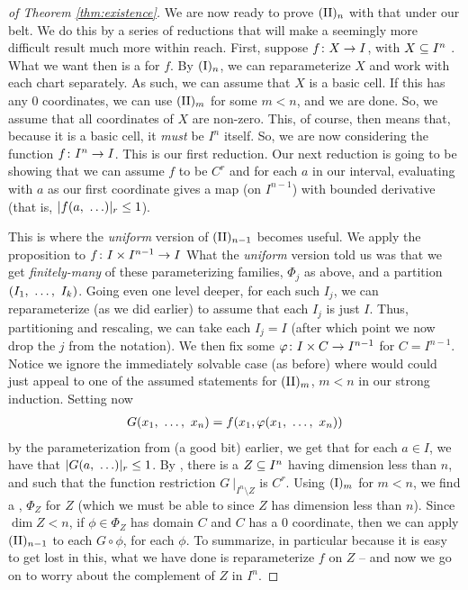\begin{proof}[of Theorem \ref{thm:existence}]
    We are now ready to prove $\IIn[n]$ with that under our belt. We do this by a series of reductions that will make a seemingly more difficult result much more within reach. First, suppose $\funcdom{f}{X}{I}$, with $\CIn[X]{n}$ . What we want then is a \cellrparam for $f$. By $\In[n]$, we can reparameterize $X$ and work with each chart separately. As such, we can assume that $X$ is a basic cell. If this has any 0 coordinates, we can use $\IIn[m]$ for some $m < n$, and we are done. So, we assume that all coordinates of $X$ are non-zero. This, of course, then means that, because it is a basic cell, it \emph{must} be $I^n$ itself. So, we are now considering the function $\funcdom{f}{I^n}{I}$. This is our first reduction. Our next reduction is going to be showing that we can assume $f$ to be $C^r$ and for each $a$ in our interval, evaluating with $a$ as our first coordinate gives a map (on $I^{n-1}$) with bounded derivative  (that is, $\rnorm{f(a, \ \hdots)} \leq 1$).

    This is where the \emph{uniform} version of $\IIn[n-1]$ becomes useful. We apply the proposition to $\funcdom{f}{I \times I^{n-1}}{I}$ What the \emph{uniform} version told us was that we get \emph{finitely-many} of these parameterizing families, $\Phi_j$ as above, and a partition $(\vonevm{I}{k})$. Going even one level deeper, for each such $I_j$, we can reparameterize (as we did earlier) to assume that each $I_j$ is just $I$. Thus, partitioning and rescaling, we can take each $I_j = I$ (after which point we now drop the $j$ from the notation). We then fix some $\funcdom{\phi}{I \times C}{I^{n-1}}$ for $C = I^{n - 1}$. Notice we ignore the immediately solvable case (as before) where would could just appeal to one of the assumed statements for $\IIn[m]$, $m < n$ in our strong induction. Setting now
     \begin{align*}
       G(\vonevm{x}{n}) = f(x_1, \phi(\vonevm{x}{n}))
     \end{align*}
     by the parameterization from (a good bit) earlier, we get that for each $a \in I$, we have that $\rnorm{G(a, \ \hdots)} \leq 1$. By \scd, there is a  $\CIn[Z]{n}$ having dimension less than $n$, and such that the function restriction $G \ \vert_{I^n \setminus Z}$ is $C^r$. Using $\In[m]$ for $m < n$, we find a \cellrparam, $\Phi_Z$ for $Z$ (which we must be able to since $Z$ has dimension less than $n$). Since $\dim{Z} < n$, if $\phi \in \Phi_Z$ has domain $C$ and $C$ has a 0 coordinate, then we can apply $\IIn[n-1]$ to each $G \circ \phi$, for each $\phi$. To summarize, in particular because it is easy to get lost in this, what we have done is reparameterize $f$ on $Z$ -- and now we go on to worry about the complement of $Z$ in $I^n$.


\end{proof}
